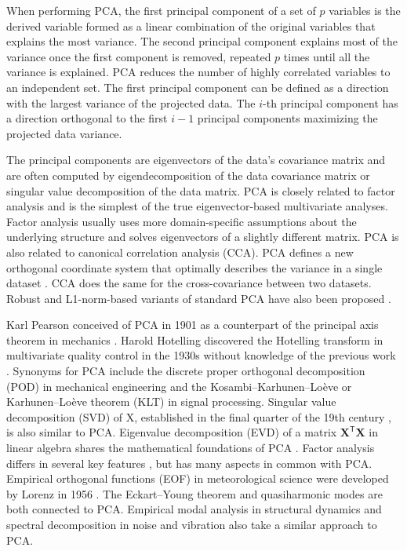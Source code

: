 \documentclass[preprint,12pt]{elsarticle}
\begin{document}
When performing PCA, the first principal component of a set of $p$ variables is the derived variable formed as a linear combination of the original variables that explains the most variance. The second principal component explains most of the variance once the first component is removed, repeated $p$ times until all the variance is explained. PCA reduces the number of highly correlated variables to an independent set. The first principal component can be defined as a direction with the largest variance of the projected data. The $i$-th principal component has a direction orthogonal to the first $i-1$ principal components maximizing the projected data variance.

The principal components are eigenvectors of the data's covariance matrix and are often computed by eigendecomposition of the data covariance matrix or singular value decomposition of the data matrix. PCA is closely related to factor analysis and is the simplest of the true eigenvector-based multivariate analyses. Factor analysis usually uses more domain-specific assumptions about the underlying structure and solves eigenvectors of a slightly different matrix. PCA is also related to canonical correlation analysis (CCA). PCA defines a new orthogonal coordinate system that optimally describes the variance in a single dataset \cite{barnett1987origins, hsu2012spectral, markopoulos2017efficient, chachlakis2019l1}. CCA does the same for the cross-covariance between two datasets. Robust and L1-norm-based variants of standard PCA have also been proposed \cite{chachlakis2019l1, markopoulos2014optimal, zhan2015robust, ke2005robust}.

Karl Pearson \cite{pearson1901liii} conceived of PCA in 1901 as a counterpart of the principal axis theorem in mechanics \cite{stewart2019introduction}. Harold Hotelling discovered the Hotelling transform in multivariate quality control in the 1930s without knowledge of the previous work \cite{hotelling1933analysis, hotelling1992relations}. Synonyms for PCA include the discrete proper orthogonal decomposition (POD) \cite{berkooz1993proper, karhunen1946spektraltheorie, loeve1977elementary, sirovich1987turbulence} in mechanical engineering and the Kosambi–Karhunen–Loève or Karhunen–Loève theorem (KLT) \cite{sapatnekar2011overcoming, ghoman2012pod, archiveKarhunenLoeveTransform, amslaurea10169, mallat1999wavelet, tang1998texture} in signal processing. Singular value decomposition (SVD) of X, established in the final quarter of the 19th century \cite{stewart1993early}, is also similar to PCA. Eigenvalue decomposition (EVD) of a matrix $\mathbf{X}^{\mathsf{T}}\mathbf{X}$ in linear algebra shares the mathematical foundations of PCA \cite{gloub1996matrix, hayden2002observations}. Factor analysis differs in several key features \cite{jolliffe2002principal}, but has many aspects in common with PCA. Empirical orthogonal functions (EOF) \cite{lorenz1956empirical} in meteorological science were developed by Lorenz in 1956 \cite{lorenz1956empirical}. The Eckart–Young theorem \cite{eckart1936approximation} and quasiharmonic modes \cite{dove1993introduction} are both connected to PCA. Empirical modal analysis in structural dynamics and spectral decomposition in noise and vibration also take a similar approach to PCA.
\end{document}
